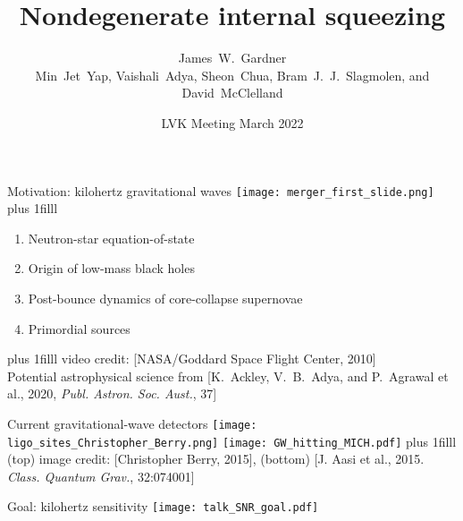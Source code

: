 \documentclass[12pt,xcolor=dvipsnames,aspectratio=169]{beamer}
\title[\url{https://dcc.ligo.org/LIGO-P2200052}]{Nondegenerate internal squeezing}
\author[James~W.~Gardner et al.]{\texorpdfstring{\large{James~W.~Gardner}\\\small{Min~Jet~Yap, Vaishali~Adya, Sheon~Chua, Bram~J.~J.~Slagmolen, and David~McClelland}}{James~Gardner}}
\institute[]{\small The Centre for Gravitational Astrophysics, ANU}
\date{LVK Meeting March 2022}
\newcommand{\vframefill}{\vskip0pt plus 1filll}
\begin{document}

{
\begin{frame}[label=titleframe,noframenumbering]
\end{frame}}

{
\begin{frame}[noframenumbering]
\end{frame}}

\begin{frame}{Motivation: kilohertz gravitational waves}
\centering
\texttt{[image: merger\_first\_slide.png]}
\vframefill
\begin{enumerate}
\item Neutron-star equation-of-state %
\item Origin of low-mass black holes
\item Post-bounce dynamics of core-collapse supernovae
\item Primordial sources %
\end{enumerate}
\vframefill
\centering
{\tiny video credit: [NASA/Goddard Space Flight Center, 2010]}\\
{\vspace{-0.2cm}\tiny Potential astrophysical science from [K.~Ackley, V.~B.~Adya, and P.~Agrawal et al., 2020, \emph{Publ. Astron. Soc. Aust.}, 37]} %
\end{frame}

\begin{frame}{Current gravitational-wave detectors}
\centering
\texttt{[image: ligo\_sites\_Christopher\_Berry.png]}
\texttt{[image: GW\_hitting\_MICH.pdf]}
\vframefill
{\tiny (top) image credit: [Christopher Berry, 2015], (bottom) [J. Aasi et al., 2015. \emph{Class. Quantum Grav.}, 32:074001]}
\end{frame}

\begin{frame}{Goal: kilohertz sensitivity}
\centering
\texttt{[image: talk\_SNR\_goal.pdf]}
\end{frame}
\end{document}
